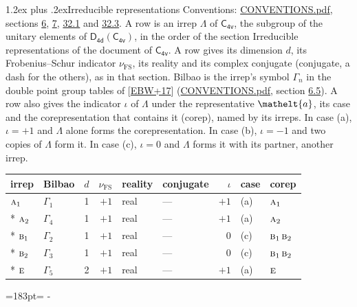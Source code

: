 \documentclass[10pt,a4paper]{article}
\makeatletter
\renewcommand\section{\@startsection{section}{1}{\z@}{-3ex plus -1ex minus -.2ex}%
  {1.2ex plus .2ex}{\normalfont\large\sffamily\bfseries\color{parttitle}}}
\newcommand{\needspace}[1]{\par\penalty-100\begingroup\dimen0=#1\relax\dimen2=\pagegoal
  \advance\dimen2-\pagetotal\ifdim\dimen0>\dimen2\relax\ifdim\dimen2>0pt\vfil\break\fi\fi
  \endgroup}
\numberwithin{equation}{section}
\newcommand{\eltfont}[1]{{\let\sigma\eltsigma\mathelt{#1}}}
\newcommand{\grp}[1]{\mathsf{#1}}
\newcommand{\irr}[1]{\text{\normalfont\scshape #1}}
\newcommand{\elt}[1]{\eltfont{#1}}
\newcommand{\fsind}{\nu_{\mathrm{FS}}}
\makeatother
\begin{document}
\section{Irreducible representations}\label{s:irreps}
Conventions: \href{../../CONVENTIONS.pdf}{CONVENTIONS.pdf}, sections \href{../../../rotation/CONVENTIONS.pdf\#conv.6}{6}, \href{../../../rotation/CONVENTIONS.pdf\#conv.7}{7}, \href{../../CONVENTIONS.pdf\#conv.32.1}{32.1} and \href{../../CONVENTIONS.pdf\#conv.32.3}{32.3}.
\leavevmode\label{n:irrep.Delta}A row is an irrep $\Lambda$ of $\grp{C_{4v}}$, the subgroup of the unitary elements of $\grp{D_{4d}}(\grp{C_{4v}})$, in the order of the section Irreducible representations of the document of \href{../../../rotation/data/pdf/C4v.pdf}{$\grp{C_{4v}}$}. \label{n:index.dimension}\label{n:index.frobenius}\label{n:head.irrep}\label{n:head.reality}\label{n:head.conjugate}A row gives its dimension $d$, its Frobenius--Schur indicator $\fsind$, its reality and its complex conjugate (conjugate, a dash for the others), as in that section. \label{n:head.bilbao}\label{n:irrep.alias.gamma}Bilbao is the irrep's symbol $\Gamma_n$ in the double point group tables of [\href{../../../REFERENCES.pdf\#ref.EBW+17}{EBW+17}] (\href{../../CONVENTIONS.pdf}{CONVENTIONS.pdf}, section \href{../../../rotation/CONVENTIONS.pdf\#conv.6.5}{6.5}). \label{n:head.case.corep}\label{n:head.corep}A row also gives the indicator $\iota$ of $\Lambda$ under the representative $\elt{a}$, its case and the corepresentation that contains it (corep), named by its irreps. In case (a), $\iota = +1$ and $\Lambda$ alone forms the corepresentation. In case (b), $\iota = -1$ and two copies of $\Lambda$ form it. In case (c), $\iota = 0$ and $\Lambda$ forms it with its partner, another irrep.
\setlength{\emergencystretch}{2em}\par\setlength{\emergencystretch}{0pt}
{\small\renewcommand{\arraystretch}{1.25}\setlength{\tabcolsep}{4pt}\begin{longtable}{@{}llrrllrll@{}}\toprule
irrep & Bilbao & $d$ & $\fsind$ & reality & conjugate & $\iota$ & case & corep\\\midrule\endhead
\bottomrule\endfoot\endlastfoot
$\irr{a}_{1}$ & $\Gamma_{1}$ & 1 & $+1$ & real & --- & $+1$ & (a) & $\irr{a}_{1}$\\*
$\irr{a}_{2}$ & $\Gamma_{4}$ & 1 & $+1$ & real & --- & $+1$ & (a) & $\irr{a}_{2}$\\*
$\irr{b}_{1}$ & $\Gamma_{2}$ & 1 & $+1$ & real & --- & $0$ & (c) & $\irr{b}_{1}\,\irr{b}_{2}$\\*
$\irr{b}_{2}$ & $\Gamma_{3}$ & 1 & $+1$ & real & --- & $0$ & (c) & $\irr{b}_{1}\,\irr{b}_{2}$\\*
$\irr{e}$ & $\Gamma_{5}$ & 2 & $+1$ & real & --- & $+1$ & (a) & $\irr{e}$\\
\bottomrule\end{longtable}}
\needspace{183pt}
\end{document}
